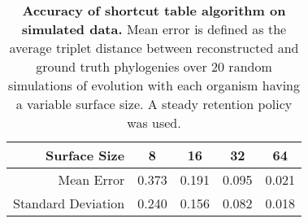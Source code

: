 \begin{table}[h]
\centering
\begin{tabular}{r|c|c|c|c}
Surface Size & 8 & 16 & 32 & 64  \\
\hline 
Mean Error & 0.373 & 0.191 & 0.095 & 0.021 \\
Standard Deviation & 0.240 & 0.156 & 0.082 & 0.018
\end{tabular}
\caption{\textbf{Accuracy of shortcut table algorithm on simulated data.}
\small Mean error is defined as the average triplet distance between reconstructed and ground truth phylogenies over 20 random simulations of evolution with each organism having a variable surface size. A steady retention policy was used.
}
\label{table:validation}

\end{table}
